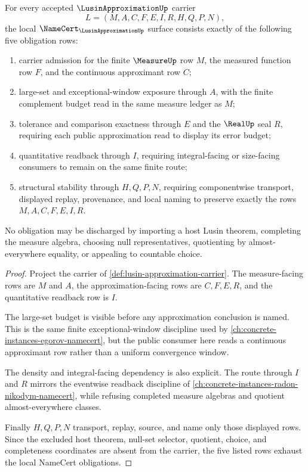 \begin{theorem}\label{thm:lusin-approximation-namecert-obligations}
For every accepted $\LusinApproximationUp$ carrier
$$
L=(M,A,C,F,E,I,R,H,Q,P,N),
$$
the local $\NameCert_{\LusinApproximationUp}$ surface consists exactly of the following five obligation rows:
\begin{enumerate}
\item carrier admission for the finite $\MeasureUp$ row $M$, the measured function row $F$, and the continuous approximant row $C$;
\item large-set and exceptional-window exposure through $A$, with the finite complement budget read in the same measure ledger as $M$;
\item tolerance and comparison exactness through $E$ and the $\RealUp$ seal $R$, requiring each public approximation read to display its error budget;
\item quantitative readback through $I$, requiring integral-facing or size-facing consumers to remain on the same finite route;
\item structural stability through $H,Q,P,N$, requiring componentwise transport, displayed replay, provenance, and local naming to preserve exactly the rows $M,A,C,F,E,I,R$.
\end{enumerate}
No obligation may be discharged by importing a host Lusin theorem, completing the measure algebra, choosing null representatives, quotienting by almost-everywhere equality, or appealing to countable choice.
\end{theorem}
\begin{proof}
Project the carrier of \autoref{def:lusin-approximation-carrier}. The measure-facing rows are $M$ and $A$, the approximation-facing rows are $C,F,E,R$, and the quantitative readback row is $I$.

The large-set budget is visible before any approximation conclusion is named. This is the same finite exceptional-window discipline used by \autoref{ch:concrete-instances-egorov-namecert}, but the public consumer here reads a continuous approximant row rather than a uniform convergence window.

The density and integral-facing dependency is also explicit. The route through $I$ and $R$ mirrors the eventwise readback discipline of \autoref{ch:concrete-instances-radon-nikodym-namecert}, while refusing completed measure algebras and quotient almost-everywhere classes.

Finally $H,Q,P,N$ transport, replay, source, and name only those displayed rows. Since the excluded host theorem, null-set selector, quotient, choice, and completeness coordinates are absent from the carrier, the five listed rows exhaust the local NameCert obligations.
\end{proof}

